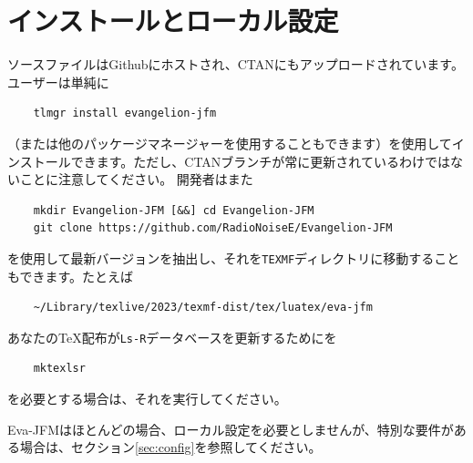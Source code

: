\documentclass[twoside]{ltjsarticle}
\def\段{\par}
\begin{document}
\section{インストールとローカル設定}
ソースファイルはGithubにホストされ、CTANにもアップロードされています。ユーザーは単純に
\begin{lstlisting}
    tlmgr install evangelion-jfm
\end{lstlisting}
（または他のパッケージマネージャーを使用することもできます）を使用してインストールできます。ただし、CTANブランチが常に更新されているわけではないことに注意してください。 開発者はまた
\begin{lstlisting}
    mkdir Evangelion-JFM [&&] cd Evangelion-JFM
    git clone https://github.com/RadioNoiseE/Evangelion-JFM
\end{lstlisting}
を使用して最新バージョンを抽出し、それを\texttt{TEXMF}ディレクトリに移動することもできます。たとえば
\begin{lstlisting}
    ~/Library/texlive/2023/texmf-dist/tex/luatex/eva-jfm
\end{lstlisting}
あなたの{\TeX}配布が\texttt{Ls-R}データベースを更新するためにを
\begin{lstlisting}
    mktexlsr
\end{lstlisting}
を必要とする場合は、それを実行してください。\段
\textsf{Eva-JFM}はほとんどの場合、ローカル設定を必要としませんが、特別な要件がある場合は、セクション\ref{sec:config}を参照してください。
\end{document}
